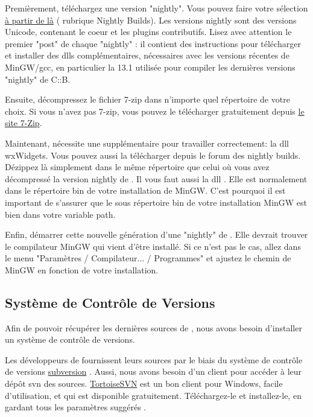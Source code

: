 Premièrement, téléchargez une version "nightly". Vous pouvez faire votre sélection \href{https://forums.codeblocks.org/}{à partir de là} (\cite{url:cbforum} rubrique Nightly Builds). Les versions nightly sont des versions Unicode, contenant le coeur et les plugins contributifs. Lisez avec attention le premier "post" de chaque "nightly" : il contient des instructions pour télécharger et installer des dlls complémentaires, nécessaires avec les versions récentes de MinGW/gcc, en particulier la 13.1 utilisée pour compiler les dernières versions "nightly" de C::B.

Ensuite, décompressez le fichier 7-zip \cite{url:zip} dans n'importe quel répertoire de votre choix. Si vous n'avez pas 7-zip, vous pouvez le télécharger gratuitement depuis \href{https://www.7-zip.org}{le site 7-Zip}.

Maintenant, \codeblocks nécessite une  supplémentaire pour travailler correctement: la dll wxWidgets. Vous pouvez aussi la télécharger depuis le forum des nightly builds. Dézippez là simplement dans le même répertoire que celui où vous avez décompressé la version nightly de \codeblocks . Il vous faut aussi la dll . Elle est normalement dans le répertoire bin de votre installation de MinGW. C'est pourquoi il est important de s'assurer que le sous répertoire bin de votre installation MinGW est bien dans votre variable path.

Enfin, démarrer cette nouvelle génération d'une "nightly" de \codeblocks. Elle devrait trouver le compilateur MinGW qui vient d'être installé. Si ce n'est pas le cas, allez dans le menu "Paramètres / Compilateur... / Programmes" et ajustez le chemin de MinGW en fonction de votre installation.

\subsection{Système de Contrôle de Versions}

Afin de pouvoir récupérer les dernières sources de \codeblocks, nous avons besoin d'installer un système de contrôle de versions.

Les développeurs de \codeblocks fournissent leurs sources par le biais du système de contrôle de versions \href{https://subversion.apache.org/}{subversion} \cite{url:subversion}. Aussi, nous avons besoin d'un client pour accéder à leur dépôt svn des sources. \href{https://tortoisesvn.net/}{TortoiseSVN} est un bon client pour Windows, facile d'utilisation, et qui est disponible gratuitement. Téléchargez-le et installez-le, en gardant tous les paramètres suggérés \cite{url:tortoisesvn}.

